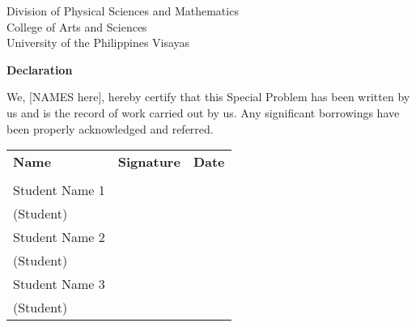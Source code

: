\begin{center}
	Division of Physical Sciences and Mathematics\\
	College of Arts and Sciences\\
	University of the Philippines Visayas 
	
		\textbf{Declaration}
		\end{center}

We,  [NAMES here], hereby certify that this Special Problem has been written by us  and is the record of work carried out by us. Any significant borrowings have been properly acknowledged and referred.

	\begin{tabular}{lll}
	\bfseries Name  & \bfseries Signature & \bfseries Date\\ \\
	Student Name 1 &\signaturerule  & \signaturerule\\ 
	\multicolumn{1}{l}{(Student)} \\ 
	Student Name 2 &\signaturerule  & \signaturerule\\ 
	\multicolumn{1}{l}{(Student)} \\
	Student Name 3 &\signaturerule  & \signaturerule\\ 
\multicolumn{1}{l}{(Student)} \\

\end{tabular}



